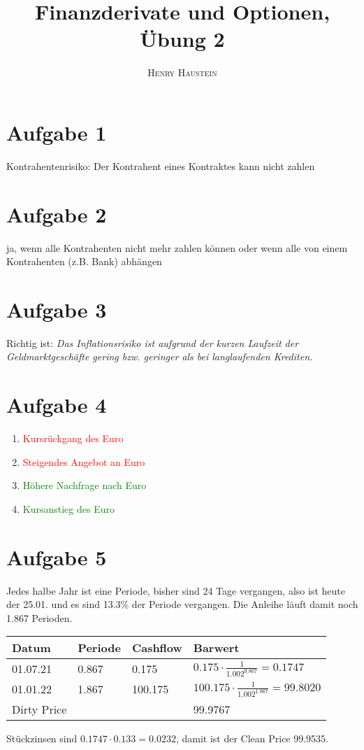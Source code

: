 \documentclass{article}
\title{\textbf{Finanzderivate und Optionen, Übung 2}}
\author{\textsc{Henry Haustein}}
\date{}
\begin{document}
	\maketitle
	
	\section*{Aufgabe 1}
	Kontrahentenrisiko: Der Kontrahent eines Kontraktes kann nicht zahlen

	\section*{Aufgabe 2}
	ja, wenn alle Kontrahenten nicht mehr zahlen können oder wenn alle von einem Kontrahenten (z.B. Bank) abhängen
	
	\section*{Aufgabe 3}
	Richtig ist: \textit{Das Inflationsrisiko ist aufgrund der kurzen Laufzeit der Geldmarktgeschäfte gering bzw. geringer als bei langlaufenden Krediten.}
	
	\section*{Aufgabe 4}
	\begin{enumerate}[label=(\alph*)]
		\item \textcolor{red}{Kursrückgang des Euro}
		\item \textcolor{red}{Steigendes Angebot an Euro}
		\item \textcolor{green}{Höhere Nachfrage nach Euro}
		\item \textcolor{green}{Kursanstieg des Euro}
	\end{enumerate}
	
	\section*{Aufgabe 5}
	Jedes halbe Jahr ist eine Periode, bisher sind 24 Tage vergangen, also ist heute der 25.01. und es sind 13.3\% der Periode vergangen. Die Anleihe läuft damit noch 1.867 Perioden.
	\begin{center}
		\begin{tabular}{llll}
			Datum & Periode & Cashflow & Barwert \\
			\hline
			01.07.21 & 0.867 & 0.175 & $0.175\cdot \frac{1}{1.002^{0.867}} = 0.1747$ \\
			01.01.22 & 1.867 & 100.175 & $100.175\cdot \frac{1}{1.002^{1.867}} = 99.8020$ \\
			\hline
			Dirty Price & & & 99.9767
		\end{tabular}
	\end{center}
	Stückzinsen sind $0.1747\cdot 0.133 = 0.0232$, damit ist der Clean Price 99.9535.
	
\end{document}
